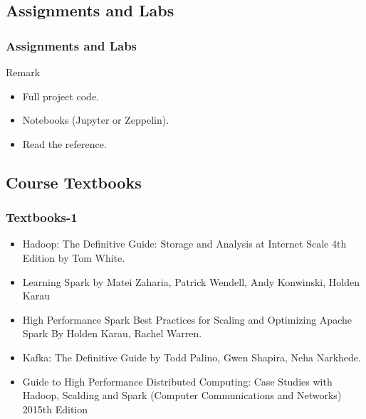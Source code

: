 \subsection{Assignments and Labs}
\begin{frame}
\frametitle{Assignments and Labs}
\begin{block}{Remark}
\begin{itemize}
	\item<1-> Full project code.
	\item<2-> Notebooks (Jupyter or Zeppelin).
	\item<3-> Read the reference.
\end{itemize}
\end{block}
\end{frame}


\subsection{Course Textbooks}
\begin{frame}
\frametitle{Textbooks-1}
	\begin{itemize}
		\item<1-> Hadoop: The Definitive Guide: Storage and Analysis at Internet Scale 4th Edition by Tom White.
		\item<2-> Learning Spark by Matei Zaharia, Patrick Wendell, Andy Konwinski, Holden Karau
		\item<3-> High Performance Spark Best Practices for Scaling and Optimizing Apache Spark By Holden Karau, Rachel Warren.
		\item<4-> Kafka: The Definitive Guide by Todd Palino, Gwen Shapira, Neha Narkhede.
		\item<5-> Guide to High Performance Distributed Computing: Case Studies with Hadoop, Scalding and Spark (Computer Communications and Networks) 2015th Edition			
	\end{itemize}
\end{frame}


